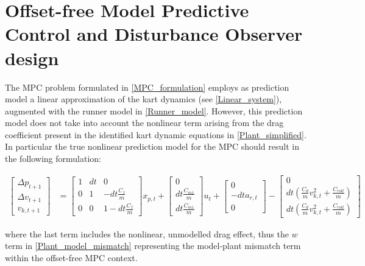 \documentclass[a4paper,12pt,oneside]{book}
\begin{document}
\section{Offset-free Model Predictive Control and Disturbance Observer design}
The MPC problem formulated in \eqref{MPC_formulation} employs as prediction model a linear approximation of the kart dynamics (see \eqref{Linear_system}), augmented with the runner model in \eqref{Runner_model}.
However, this prediction model does not take into account the nonlinear term arising from the drag coefficient present in the identified kart dynamic equations in \ref{Plant_simplified}.
In particular the true nonlinear prediction model for the MPC should result in the following formulation:

\begin{equation}
\begin{aligned}
    \begin{bmatrix}
        \Delta p_{t+1}  \\
        \Delta v_{t+1} \\
        v_{k,t+1}
    \end{bmatrix}
    & =
    \begin{bmatrix}
        1 & dt & 0 \\
        0 & 1 & -dt\frac{C_f}{m} \\
        0 & 0 & 1-dt\frac{C_f}{m}
    \end{bmatrix}
    x_{p,t}
    +
    \begin{bmatrix}
        0 \\
        dt \frac{C_{m1}}{m} \\
        dt \frac{C_{m1}}{m}
    \end{bmatrix}
    u_t + 
    \begin{bmatrix}
    0 \\
    - dt a_{r,t} \\
    0
    \end{bmatrix} 
    -
    \begin{bmatrix}
    0 \\
    dt (\frac{C_{d}}{m} v_{k,t}^2+ \frac{C_{roll}}{m}) \\
    dt (\frac{C_{d}}{m} v_{k,t}^2+ \frac{C_{roll}}{m})
    \end{bmatrix}
\end{aligned}
\label{Non-lin_prediction_model_MPC}
\end{equation}

where the last term includes the nonlinear, unmodelled drag effect, thus the $w$ term in \eqref{Plant_model_mismatch} representing the model-plant mismatch term within the offset-free MPC context.
\end{document}
